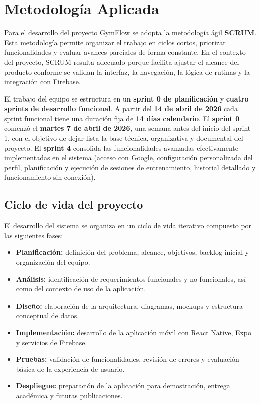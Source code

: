 \section{Metodología Aplicada}

Para el desarrollo del proyecto GymFlow se adopta la metodología ágil \textbf{SCRUM}. Esta metodología permite organizar el trabajo en ciclos cortos, priorizar funcionalidades y evaluar avances parciales de forma constante. En el contexto del proyecto, SCRUM resulta adecuado porque facilita ajustar el alcance del producto conforme se validan la interfaz, la navegación, la lógica de rutinas y la integración con Firebase.

El trabajo del equipo se estructura en un \textbf{sprint 0 de planificación} y \textbf{cuatro sprints de desarrollo funcional}. A partir del \textbf{14 de abril de 2026} cada sprint funcional tiene una duración fija de \textbf{14 días calendario}. El \textbf{sprint 0} comenzó el \textbf{martes 7 de abril de 2026}, una semana antes del inicio del sprint 1, con el objetivo de dejar lista la base técnica, organizativa y documental del proyecto. El \textbf{sprint 4} consolida las funcionalidades avanzadas efectivamente implementadas en el sistema (acceso con Google, configuración personalizada del perfil, planificación y ejecución de sesiones de entrenamiento, historial detallado y funcionamiento sin conexión).

\subsection{Ciclo de vida del proyecto}

El desarrollo del sistema se organiza en un ciclo de vida iterativo compuesto por las siguientes fases:

\begin{itemize}
\item \textbf{Planificación:} definición del problema, alcance, objetivos, backlog inicial y organización del equipo.
\item \textbf{Análisis:} identificación de requerimientos funcionales y no funcionales, así como del contexto de uso de la aplicación.
\item \textbf{Diseño:} elaboración de la arquitectura, diagramas, mockups y estructura conceptual de datos.
\item \textbf{Implementación:} desarrollo de la aplicación móvil con React Native, Expo y servicios de Firebase.
\item \textbf{Pruebas:} validación de funcionalidades, revisión de errores y evaluación básica de la experiencia de usuario.
\item \textbf{Despliegue:} preparación de la aplicación para demostración, entrega académica y futuras publicaciones.
\end{itemize}

